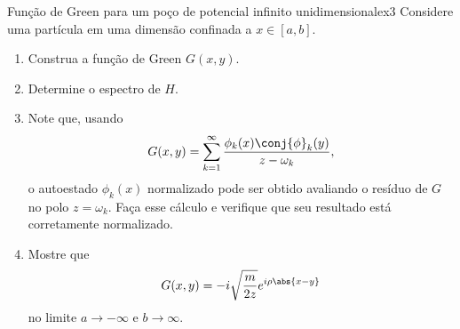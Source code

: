 \begin{exercício}{Função de Green para um poço de potencial infinito unidimensional}{ex3}
   Considere uma partícula em uma dimensão confinada a \(x \in [a,b].\)
   \begin{enumerate}[label=(\alph*)]
       \item Construa a função de Green \(G(x,y)\).
       \item Determine o espectro de \(H\).
       \item Note que, usando
          \begin{equation*}
             G(x,y) = \sum_{k = 1}^\infty \frac{\phi_k(x) \conj{\phi}_k(y)}{z - \omega_k},
          \end{equation*}
          o autoestado \(\phi_k(x)\) normalizado pode ser obtido avaliando o resíduo de \(G\) no polo \(z = \omega_k\). Faça esse cálculo e verifique que seu resultado está corretamente normalizado.
       \item Mostre que
          \begin{equation*}
             G(x,y) = -i \sqrt{\frac{m}{2 z}} e^{i \rho \abs{x - y}}
          \end{equation*}
          no limite \(a \to -\infty\) e \(b \to \infty\).
   \end{enumerate}
\end{exercício}
